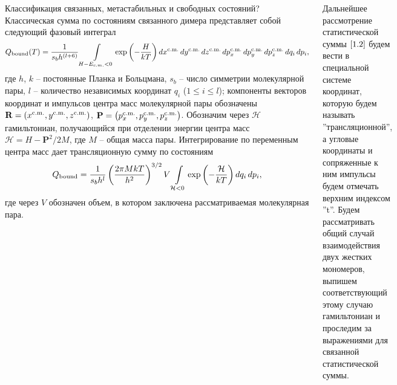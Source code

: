 \documentclass[
  14pt,
  a1paper,
  portrait, 
  margin=0mm,
  innermargin=15mm,
  blockverticalspace=0mm,
  colspace=0mm,
  subcolspace=0mm
]{tikzposter}
\newcommand{\lb}{\left(}
\newcommand{\rb}{\right)}
\newcommand{\mH}{\mathcal{H}}
\begin{document}
\begin{columns}
{
	Классификация связанных, метастабильных и свободных состояний? 
	Классическая сумма по состояниям связанного димера представляет собой следующий фазовый интеграл
	\begin{gather}
			Q_{\textup{bound}}(T) = \frac{1}{s_b h^{(l + 6)}} \int\limits_{H - E_{c.m.} < 0} \exp \left( -\frac{H}{kT} \right) dx^{\textup{c.m.}} \, dy^\textup{c.m.} \, dz^\textup{c.m.} \, dp_x^\textup{c.m.} \, dp_y^\textup{c.m.} \, dp_z^\textup{c.m.} \, dq_i \, dp_i, \label{1.1}
	\end{gather}
	где $h$, $k$ -- постоянные Планка и Больцмана, $s_b$ -- число симметрии молекулярной пары, $l$ -- количество независимых координат $q_i$ ($1 \leqslant i \leqslant l$); компоненты векторов координат и импульсов центра масс молекулярной пары обозначены $\mathbf{R} = \lb x^\textup{c.m.}, y^\textup{c.m.}, z^\textup{c.m.} \rb$, $\mathbf{P} = \lb p_x^\textup{c.m.}, p_y^\textup{c.m.}, p_z^\textup{c.m.} \rb$. Обозначим через $\mH$ гамильтониан, получающийся при отделении энергии центра масс $\mH = H - \mathbf{P}^2/2M$, где $M$ -- общая масса пары. Интегрирование по переменным центра масс дает трансляционную сумму по состояниям
	\begin{gather}
			Q_\textup{bound} = \frac{1}{s_b h^l} \lb \frac{2 \pi M k T}{h^2} \rb^{3/2} V \int\limits_{\mH < 0} \exp \lb - \frac{\mH}{kT} \rb dq_i \, dp_i, \label{1.2}
	\end{gather}
	где через $V$ обозначен объем, в котором заключена рассматриваемая молекулярная пара. \par
	Дальнейшее рассмотрение статистической суммы $\eqref{1.2}$ будем вести в специальной системе координат, которую будем называть ''трансляционной'', а угловые координаты и сопряженные к ним импульсы будем отмечать верхним индексом ''t''. Будем рассматривать общий случай взаимодействия двух жестких мономеров, выпишем соответствующий этому случаю гамильтониан и проследим за выражениями для связанной статистической суммы. 
	
	\vspace*{-0.5cm}
}
\end{columns}
\end{document}
